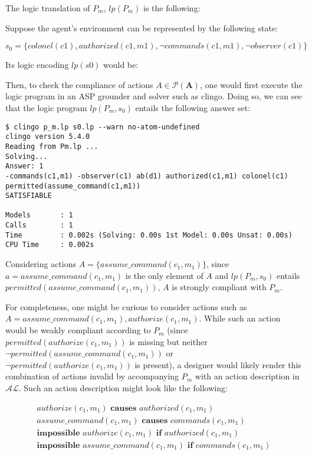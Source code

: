 The logic translation of $P_m$, $lp(P_m)$ is the following:



Suppose the agent's environment can be represented by the following state:

\[
s_0 = \{colonel(c1), authorized(c1,m1), \neg commands(c1,m1), \neg observer(c1) \}
\]

Its logic encoding $lp(s0)$ would be:



Then, to check the compliance of actions $A \in \mathcal{P}(\boldsymbol{A})$, one would first execute the logic program in an ASP grounder and solver such as clingo.
Doing so, we can see that the logic program $lp(P_m, s_0)$ entails the following answer set:

\begin{lstlisting}
$ clingo p_m.lp s0.lp --warn no-atom-undefined
clingo version 5.4.0
Reading from Pm.lp ...
Solving...
Answer: 1
-commands(c1,m1) -observer(c1) ab(d1) authorized(c1,m1) colonel(c1) permitted(assume_command(c1,m1))
SATISFIABLE

Models       : 1
Calls        : 1
Time         : 0.002s (Solving: 0.00s 1st Model: 0.00s Unsat: 0.00s)
CPU Time     : 0.002s
\end{lstlisting}

Considering actions $A=\{assume\_command(c_1, m_1)\}$, since $a = assume\_command(c_1, m_1)$ is the only element of $A$ and $lp(P_m, s_0)$ entails $permitted(assume\_command(c_1, m_1))$, $A$ is strongly compliant with $P_m$.

For completeness, one might be curious to consider actions such as $A = {assume\_command(c_1, m_1), authorize(c_1, m_1)}$.
While such an action would be weakly compliant according to $P_m$ (since $permitted(authorize(c_1, m_1))$ is missing but neither $\neg permitted(assume\_command(c_1, m_1))$ or $\neg permitted(authorize(c_1, m_1))$ is present), a designer would likely render this combination of actions invalid by accompanying $P_m$ with an action description in $\mathcal{AL}$.
Such an action description might look like the following:

\begin{gather*}
    authorize(c_1, m_1) \textbf{ causes } authorized(c_1, m_1) \\
    assume\_command(c_1, m_1) \textbf{ causes } commands(c_1, m_1) \\
    \textbf{impossible } authorize(c_1, m_1) \textbf{ if } authorized(c_1, m_1) \\
    \textbf{impossible } assume\_command(c_1, m_1) \textbf{ if } commands(c_1, m_1)
\end{gather*}

